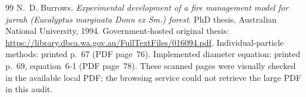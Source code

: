 \documentclass[11pt,a4paper]{article}
\begin{document}
\begin{thebibliography}{99}
N.~D. Burrows.
\emph{Experimental development of a fire management model for jarrah
(Eucalyptus marginata Donn ex Sm.) forest}.
PhD thesis, Australian National University, 1994.
Government-hosted original thesis:
\url{https://library.dbca.wa.gov.au/FullTextFiles/016094.pdf}.
Individual-particle methods: printed p.~67 (PDF page~76).
Implemented diameter equation: printed p.~69, equation~6-1 (PDF page~78).
These scanned pages were visually checked in the available local PDF;
the browsing service could not retrieve the large PDF in this audit.


\end{thebibliography}
\end{document}
